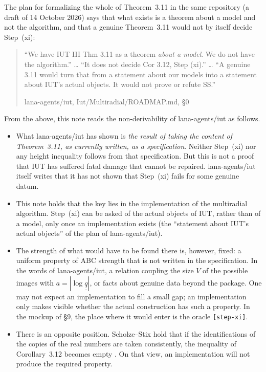 \documentclass[11pt,a4paper]{article}
\newcommand{\qq}{\underline{\underline{q}}}
\newcommand{\leanus}{\textunderscore\allowbreak}
\newcommand{\lean}[1]{{\ttfamily\let\_\leanus #1}}
\newcommand{\orc}[1]{\texttt{[#1]}}
\newcommand{\lab}[2]{{\upshape\fcolorbox{#1}{#1!8}{\scriptsize\sffamily\bfseries\textcolor{#1}{#2}}}}
\newcommand{\tagX}{\lab{Purple}{X}}
\newcommand{\tagH}{\lab{BurntOrange}{H}}
\newcommand{\q}[1]{``#1''}
\newcommand{\srcquote}[2]{\begin{quote}\small #1\par\nopagebreak\hfill{\footnotesize #2}\end{quote}}
\begin{document}
\tagX{} The plan for formalizing the whole of Theorem~3.11 in the same repository (a draft of 14 October 2026) says that
what exists is a theorem about a model and not the algorithm, and that a genuine Theorem~3.11 would not by itself decide
Step~(xi):
\srcquote{\q{We have IUT III Thm 3.11 as a theorem \emph{about a model}. We do not have the algorithm.} \dots{}
\q{It does not decide Cor 3.12, Step (xi).} \dots{}
\q{A genuine 3.11 would turn that from a statement about our models into a statement about IUT's actual objects. It
would not prove or refute SS.}}{lana-agents/iut, \lean{Iut/\allowbreak{}Multiradial/\allowbreak{}ROADMAP.md}, \S0 \cite{lana}}

\tagH{} From the above, this note reads the non-derivability of lana-agents/iut as follows.
\begin{itemize}
\item What lana-agents/iut has shown is \emph{the result of taking the content of Theorem~3.11, as currently written,
as a specification}. Neither Step~(xi) nor any height inequality follows from that specification. But this is not a
proof that IUT has suffered fatal damage that cannot be repaired. lana-agents/iut itself writes that it has not shown
that Step~(xi) fails for some genuine datum.
\item This note holds that the key lies in the implementation of the multiradial algorithm. Step~(xi) can be asked of
the actual objects of IUT, rather than of a model, only once an implementation exists (the ``statement about IUT's
actual objects'' of the plan of lana-agents/iut).
\item The strength of what would have to be found there is, however, fixed: a uniform property of ABC strength that is
not written in the specification. In the words of lana-agents/iut, a relation coupling the size $V$ of the possible
images with $a=|\log\qq|$, or facts about genuine data beyond the package. One may not expect an implementation to fill
a small gap; an implementation only makes visible whether the actual construction has such a property. In the mockup
of \S9, the place where it would enter is the oracle \orc{step-xi}.
\item There is an opposite position. Scholze--Stix hold that if the identifications of the copies of the real numbers
are taken consistently, the inequality of Corollary~3.12 becomes empty \cite[\S2.2]{SS}. On that view, an
implementation will not produce the required property.
\end{itemize}
\end{document}

